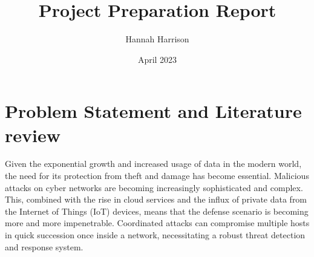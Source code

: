 \documentclass{article}
\title{Project Preparation Report}
\author{Hannah Harrison}
\date{April 2023}
\begin{document}
\maketitle

\tableofcontents
\pagebreak





\section{Problem Statement and Literature review}








Given the exponential growth and increased usage of data in the modern world, the need for its protection from theft and damage has become essential. Malicious attacks on cyber networks are becoming increasingly sophisticated and complex. This, combined with the rise in cloud services and the influx of private data from the Internet of Things (IoT) devices, means that the defense scenario is becoming more and more impenetrable. Coordinated attacks can compromise multiple hosts in quick succession once inside a network, necessitating a robust threat detection and response system. 
\end{document}
